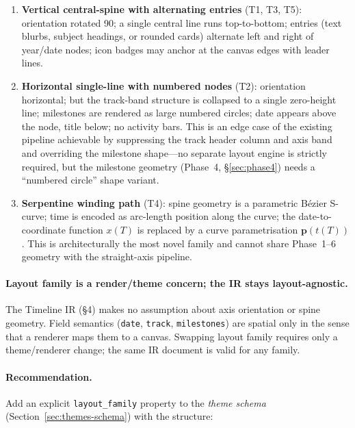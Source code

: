 \begin{enumerate}
  \item \textbf{Vertical central-spine with alternating entries} (T1, T3, T5):
        orientation rotated 90\textdegree; a single central line runs top-to-bottom;
        entries (text blurbs, subject headings, or rounded cards) alternate left and
        right of year/date nodes; icon badges may anchor at the canvas edges with leader
        lines.

  \item \textbf{Horizontal single-line with numbered nodes} (T2):
        orientation horizontal; but the track-band structure is collapsed to a single
        zero-height line; milestones are rendered as large numbered circles; date appears
        above the node, title below; no activity bars. This is an edge case of the
        existing pipeline achievable by suppressing the track header column and axis band
        and overriding the milestone shape---no separate layout engine is strictly
        required, but the milestone geometry (Phase~4, \S\ref{sec:phase4}) needs a
        ``numbered circle'' shape variant.

  \item \textbf{Serpentine winding path} (T4):
        spine geometry is a parametric B\'{e}zier S-curve; time is encoded as arc-length
        position along the curve; the date-to-coordinate function $x(T)$ is replaced by
        a curve parametrisation $\mathbf{p}(t(T))$. This is architecturally the most
        novel family and cannot share Phase~1--6 geometry with the straight-axis pipeline.
\end{enumerate}

\paragraph{Layout family is a render/theme concern; the IR stays layout-agnostic.}
The Timeline IR (\S4) makes no assumption about axis orientation or spine geometry.
Field semantics (\texttt{date}, \texttt{track}, \texttt{milestones}) are spatial only
in the sense that a renderer maps them to a canvas. Swapping layout family requires
only a theme/renderer change; the same IR document is valid for any family.

\paragraph{Recommendation.}
Add an explicit \texttt{layout\_family} property to the \emph{theme schema}
(Section~\ref{sec:themes-schema}) with the structure:


